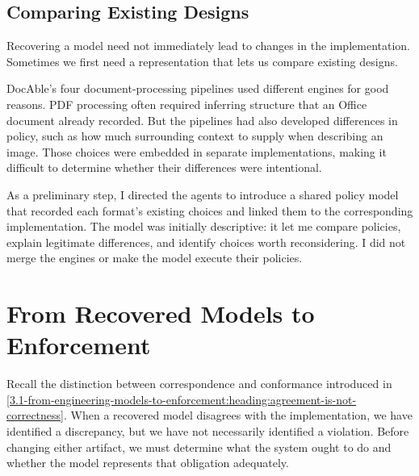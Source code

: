 \subsection{Comparing Existing Designs}\label{heading:comparing-existing-designs}

Recovering a model need not immediately lead to changes in the implementation. Sometimes we first need a representation that lets us compare existing designs.

DocAble's four document-processing pipelines used different engines for good reasons. PDF processing often required inferring structure that an Office document already recorded. But the pipelines had also developed differences in policy, such as how much surrounding context to supply when describing an image. Those choices were embedded in separate implementations, making it difficult to determine whether their differences were intentional.

As a preliminary step, I directed the agents to introduce a shared policy model that recorded each format's existing choices and linked them to the corresponding implementation. The model was initially descriptive: it let me compare policies, explain legitimate differences, and identify choices worth reconsidering. I did not merge the engines or make the model execute their policies.


\section{From Recovered Models to Enforcement}\label{heading:reconcile-the-map-and-the-territory}

Recall the distinction between correspondence and conformance introduced in \autoref{3.1-from-engineering-models-to-enforcement:heading:agreement-is-not-correctness}. When a recovered model disagrees with the implementation, we have identified a discrepancy, but we have not necessarily identified a violation. Before changing either artifact, we must determine what the system ought to do and whether the model represents that obligation adequately.

